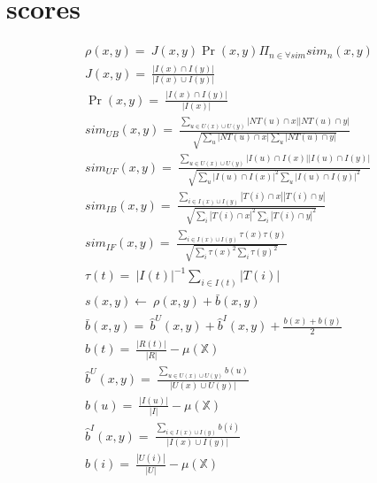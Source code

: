 \section{scores}
\begin{gather}
    \rho(x,y)=~ J(x,y)\Pr(x,y) \Pi_{n \in \forall sim} sim_{n}(x,y) \label{eq:tags_distances} \\
    J(x,y)=~ \frac{|I(x)\cap I(y)|}{|I(x)\cup I(y)|} \\
    \Pr(x,y)=~ \frac{|I(x)\cap I(y)|}{|I(x)|}\\ 
    sim_{UB}(x,y)=~ 
    \frac{\sum_{u\in U(x)\cup U(y)}|NT(u) \cap x| |NT(u) \cap y|}
    {\sqrt{\sum_{u}|NT(u) \cap x|\sum_{u}|NT(u) \cap y|}} \\
    sim_{UF}(x,y)=~ 
    \frac{\sum_{u \in U(x)\cup U(y)}|I(u)\cap I(x)| |I(u)\cap I(y)|}
    {\sqrt{\sum_{u}|I(u)\cap I(x)|^{2}\sum_{u}|I(u)\cap I(y)|^{2}}} \\
    sim_{IB}(x,y)=~ 
    \frac{\sum_{i\in I(x)\cup I(y)}|T(i)\cap x| |T(i) \cap y|}
    {\sqrt{\sum_{i}|T(i)\cap x|^{2}\sum_{i}|T(i)\cap y|^{2}}}  \\ 
    sim_{IF}(x,y)=~ 
    \frac{\sum_{i\in I(x)\cup I(y)}\tau(x) \tau(y)}
    {\sqrt{\sum_{i}\tau(x)^{2}\sum_{i}\tau(y)^{2}}} \\
    \tau(t)=~ |I(t)|^{-1}\sum_{i \in I(t)}|T(i)| \\ 
    s(x,y) \leftarrow ~  \rho(x,y) + \bar{b}(x,y) \label{eq:tags_scores} \\
    \bar{b}(x,y) =~ \hat{b}^{U}(x,y) + \hat{b}^{I}(x,y) + \frac{b(x) + b(y)}{2} \label{eq:tendencies_scores} \\
    b(t) =~ \frac{|R(t)|}{|R|} - \mu(\mathbb{X})   \\
    \hat{b}^{U}(x,y) =~ \frac{\sum_{u \in U(x) \cup U(y)} b(u)}{|U(x) \cup U(y)|}   \\
    b(u) =~ \frac{|I(u)|}{|I|} - \mu (\mathbb{X})   \\
    \hat{b}^{I}(x,y) =~ \frac{\sum_{i \in I(x) \cup I(y)} b(i)}{|I(x) \cup I(y)|}   \\
    b(i) =~ \frac{|U(i)|}{|U|} - \mu (\mathbb{X})
\end{gather}